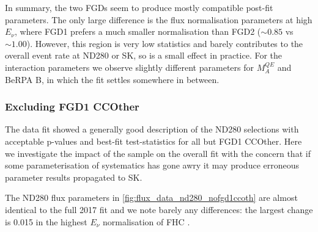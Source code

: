 In summary, the two FGDs seem to produce mostly compatible post-fit parameters. The only large difference is the flux normalisation parameters at high $E_\nu$, where FGD1 prefers a much smaller normalisation than FGD2 ($\sim 0.85$ vs $\sim 1.00$). However, this region is very low statistics and barely contributes to the overall event rate at ND280 or SK, so is a small effect in practice. For the interaction parameters we observe slightly different parameters for $M_A^{QE}$ and BeRPA B, in which the fit settles somewhere in between.

\subsubsection{Excluding FGD1 CCOther}
The data fit showed a generally good description of the ND280 selections with acceptable p-values and best-fit test-statistics for all but FGD1 CCOther. Here we investigate the impact of the sample on the overall fit with the concern that if some parameterisation of systematics has gone awry it may produce erroneous parameter results propagated to SK. 

The ND280 flux parameters in \autoref{fig:flux_data_nd280_nofgd1ccoth} are almost identical to the full 2017 fit and we note barely any differences: the largest change is 0.015 in the highest $E_\nu$ normalisation of FHC \numu.

